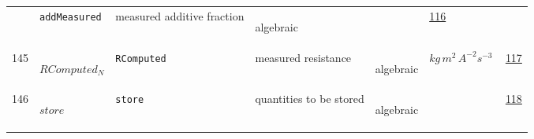 \begin{longtable}{|p{1cm}|p{2.5cm}|p{4.5cm}|p{8cm}|p{3.0cm}|p{3cm}|p{1cm}|}
             & \verb|addMeasured|
             & measured additive fraction
             & \begin{lay}algebraic \end{lay}
             & $  $
             & \hyperlink{"e:116"}{ 116 }
                 \\
    145
             & \hypertarget{"v:145"}{ $ {RComputed}{_{N}} $}
             & \verb|RComputed|
             & measured resistance 
             & \begin{lay}algebraic \end{lay}
             & $ kg \,m^{2} \,A^{-2} s^{-3} \, $
             & \hyperlink{"e:117"}{ 117 }
                 \\
    146
             & \hypertarget{"v:146"}{ $ {store}{_{}} $}
             & \verb|store|
             & quantities to be stored
             & \begin{lay}algebraic \end{lay}
             & $  $
             & \hyperlink{"e:118"}{ 118 }
                 \\
    \end{longtable}